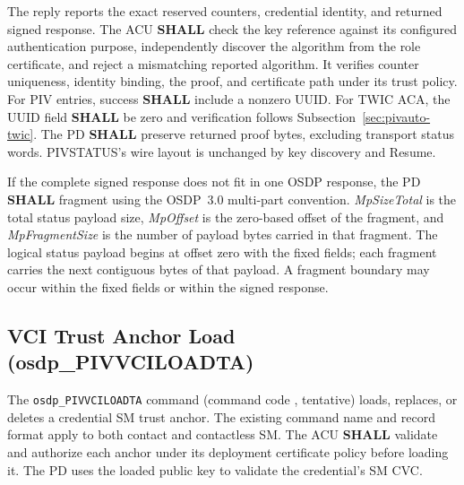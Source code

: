 The reply reports the exact reserved counters, credential identity, and returned signed
response. The ACU \textbf{SHALL} check the key reference against its configured authentication
purpose, independently discover the algorithm from the role certificate, and reject a
mismatching reported algorithm. It verifies counter uniqueness, identity binding, the proof,
and certificate path under its trust policy. For PIV entries, success
\textbf{SHALL} include a nonzero UUID. For TWIC ACA, the UUID field
\textbf{SHALL} be zero and verification follows Subsection~\ref{sec:pivauto-twic}. The PD
\textbf{SHALL} preserve returned proof bytes, excluding transport status words.
PIVSTATUS's wire layout is unchanged by key discovery and Resume.

If the complete signed response does not fit in one OSDP response, the PD
\textbf{SHALL} fragment  using the OSDP~3.0
multi-part convention. \emph{MpSizeTotal} is the total status payload size,
\emph{MpOffset} is the zero-based offset of the fragment, and
\emph{MpFragmentSize} is the number of payload bytes carried in that fragment.
The logical status payload begins at offset zero with the fixed fields; each fragment carries
the next contiguous bytes of that payload. A fragment boundary may occur within the fixed
fields or within the signed response.

\subsection{VCI Trust Anchor Load (osdp\_PIVVCILOADTA)}

The \texttt{osdp\_PIVVCILOADTA} command (command code , tentative)
loads, replaces, or deletes a credential SM trust anchor. The existing command
name and record format apply to both contact and contactless SM. The ACU
\textbf{SHALL} validate and authorize each anchor under its deployment
certificate policy before loading it. The PD uses the loaded public key to
validate the credential's SM CVC.



